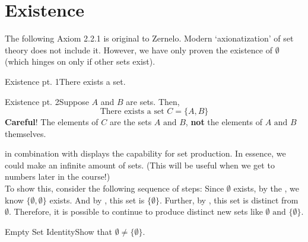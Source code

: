 \section{Existence}

\vspace*{\fill}

    The following Axiom 2.2.1 is original to Zernelo. Modern `axionatization' of set theory does not include it. However, we have only proven the existence of \(\emptyset\) (which hinges on only if other sets exist).

    \begin{axiom}
        {Existence pt. 1}There exists a set.
    \end{axiom}

    \vspace{0.5cm}
    
    \begin{axiom}
        {Existence pt. 2}Suppose \(A\) and \(B\) are sets. Then, \[\text{There exists a set } C = \{A,B\}\]
        \textbf{Careful}! The elements of \(C\) are the sets \(A \text{ and } B\), \textbf{not} the elements of \(A \text{ and } B\) themselves.
    \end{axiom}


\newpage

     in combination with   displays the capability for set production. In essence, we could make an infinite amount of sets. (This will be useful when we get to numbers later in the course!) \\
    
    To show this, consider the following sequence of steps: Since \(\emptyset\) exists, by the , we know \(\{\emptyset,\emptyset\}\) exists. And by , this set is \(\{\emptyset\}\). Further, by , this set is distinct from \(\emptyset\). Therefore, it is possible to continue to produce distinct new sets like \(\emptyset \text{ and } \{\emptyset\}\).

    \begin{exercise}
        {Empty Set Identity}Show that \(\emptyset \ne \{\emptyset\}\).
    \end{exercise}


